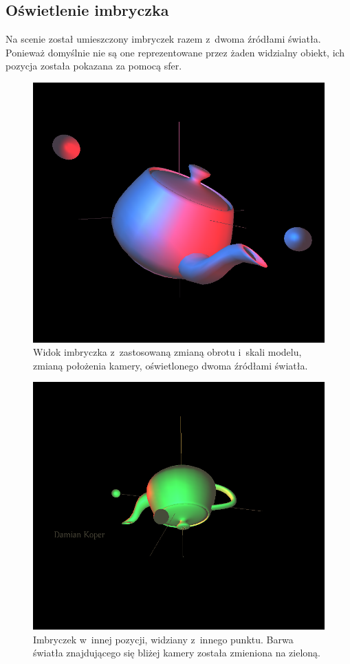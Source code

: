 \subsection{Oświetlenie imbryczka}
Na scenie został umieszczony imbryczek razem z~dwoma źródłami światła. Ponieważ domyślnie nie są one reprezentowane przez żaden widzialny obiekt, ich pozycja została pokazana za pomocą sfer.
\begin{figure}[h]
    \centering
    \includegraphics[width=0.55\linewidth, trim={0cm 3cm 0cm 3cm},clip]{img/teapot_1.png}
    \caption{Widok imbryczka z~zastosowaną zmianą obrotu i~skali modelu, zmianą położenia kamery, oświetlonego dwoma źródłami światła.}
\end{figure}
\begin{figure}[H]
    \centering
    \includegraphics[width=0.8\linewidth, trim={0cm 6cm 0cm 2cm},clip]{img/teapot_2.png}
    \caption{Imbryczek w~innej pozycji, widziany z~innego punktu. Barwa światła znajdującego się bliżej kamery została zmieniona na zieloną.}
\end{figure}
